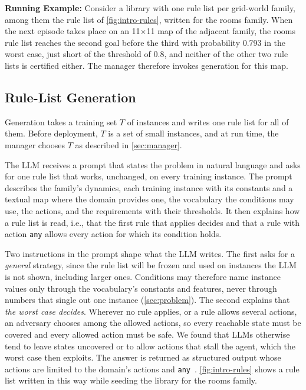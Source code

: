 \textbf{Running Example:}
Consider a library with one rule list per grid-world family, among them the rule list of \autoref{fig:intro-rules}, written for the rooms family.
When the next episode takes place on an 11$\times$11 map of the adjacent family, the rooms rule list reaches the second goal before the third with probability 0.793 in the worst case, just short of the threshold of 0.8, and neither of the other two rule lists is certified either.
The manager therefore invokes generation for this map.

\subsection{Rule-List Generation}
\label{sec:generation}

Generation takes a training set $T$ of instances and writes one rule list for all of them.
Before deployment, $T$ is a set of small instances, and at run time, the manager chooses $T$ as described in \autoref{sec:manager}.

The LLM receives a prompt that states the problem in natural language and asks for one rule list that works, unchanged, on every training instance.
The prompt describes the family's dynamics, each training instance with its constants and a textual map where the domain provides one, the vocabulary the conditions may use, the actions, and the requirements with their thresholds.
It then explains how a rule list is read, i.e., that the first rule that applies decides and that a rule with action \texttt{any} allows every action for which its condition holds.

Two instructions in the prompt shape what the LLM writes.
The first asks for a \textit{general} strategy, since the rule list will be frozen and used on instances the LLM is not shown, including larger ones.
Conditions may therefore name instance values only through the vocabulary's constants and features, never through numbers that single out one instance (\autoref{sec:problem}).
The second explains that \textit{the worst case decides}.
Wherever no rule applies, or a rule allows several actions, an adversary chooses among the allowed actions, so every reachable state must be covered and every allowed action must be safe.
We found that LLMs otherwise tend to leave states uncovered or to allow actions that stall the agent, which the worst case then exploits.
The answer is returned as structured output whose actions are limited to the domain's actions and \texttt{any}~\cite{TODO-structured-outputs}.
\autoref{fig:intro-rules} shows a rule list written in this way while seeding the library for the rooms family.

